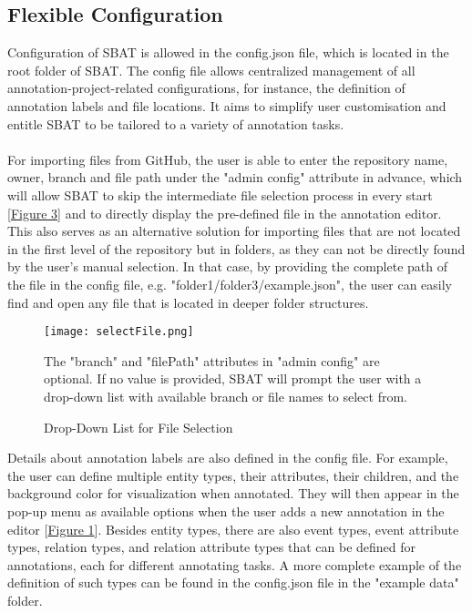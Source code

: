 \documentclass[12ptm a4paper]{article}
\begin{document}
\subsection{Flexible Configuration}
Configuration of SBAT is allowed in the config.json file, which is located in the root folder of SBAT. The config file allows centralized management of all annotation-project-related configurations, for instance, the definition of annotation labels and file locations. It aims to simplify user customisation and entitle SBAT to be tailored to a variety of annotation tasks.\\
\\
For importing files from GitHub, the user is able to enter the repository name, owner, branch and file path under the "admin config" attribute in advance, which will allow SBAT to skip the intermediate file selection process in every start [\hyperref[figure3]{Figure 3}] and to directly display the pre-defined file in the annotation editor. This also serves as an alternative solution for importing files that are not located in the first level of the repository but in folders, as they can not be directly found by the user's manual selection. In that case, by providing the complete path of the file in the config file, e.g. "folder1/folder3/example.json", the user can easily find and open any file that is located in deeper folder structures. \\
\begin{figure}[H]
{\centering
\texttt{[image: selectFile.png]}
\label{figure3}
\caption{Drop-Down List for File Selection}
}
{ 
The "branch" and "filePath" attributes in "admin config" are optional. If no value is provided, SBAT will prompt the user with a drop-down list with available branch or file names to select from.
\par}
\end{figure}
Details about annotation labels are also defined in the config file. For example, the user can define multiple entity types, their attributes, their children, and the background color for visualization when annotated. They will then appear in the pop-up menu as available options when the user adds a new annotation in the editor [\hyperref[figure1]{Figure 1}]. Besides entity types, there are also event types, event attribute types, relation types, and relation attribute types that can be defined for annotations, each for different annotating tasks.  A more complete example of the definition of such types can be found in the config.json file in the "example data" folder.
\end{document}
